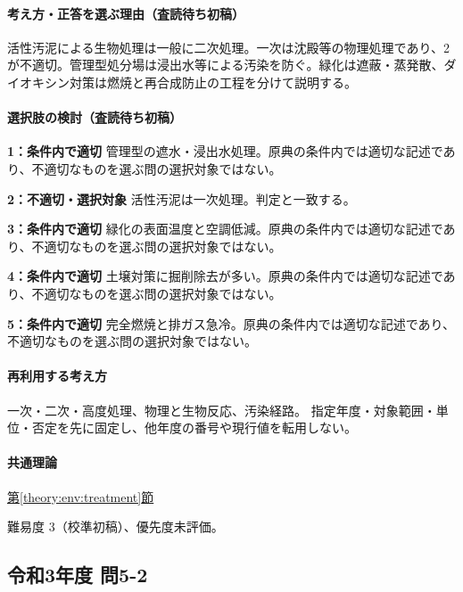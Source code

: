 \paragraph{考え方・正答を選ぶ理由（査読待ち初稿）} 活性汚泥による生物処理は一般に二次処理。一次は沈殿等の物理処理であり、2が不適切。管理型処分場は浸出水等による汚染を防ぐ。緑化は遮蔽・蒸発散、ダイオキシン対策は燃焼と再合成防止の工程を分けて説明する。

\paragraph{選択肢の検討（査読待ち初稿）}\mbox{}\par

\noindent\textbf{1：条件内で適切} 管理型の遮水・浸出水処理。原典の条件内では適切な記述であり、不適切なものを選ぶ問の選択対象ではない。\par

\noindent\textbf{2：不適切・選択対象} 活性汚泥は一次処理。判定と一致する。\par

\noindent\textbf{3：条件内で適切} 緑化の表面温度と空調低減。原典の条件内では適切な記述であり、不適切なものを選ぶ問の選択対象ではない。\par

\noindent\textbf{4：条件内で適切} 土壌対策に掘削除去が多い。原典の条件内では適切な記述であり、不適切なものを選ぶ問の選択対象ではない。\par

\noindent\textbf{5：条件内で適切} 完全燃焼と排ガス急冷。原典の条件内では適切な記述であり、不適切なものを選ぶ問の選択対象ではない。\par

\paragraph{再利用する考え方} 一次・二次・高度処理、物理と生物反応、汚染経路。 指定年度・対象範囲・単位・否定を先に固定し、他年度の番号や現行値を転用しない。

\paragraph{共通理論} \hyperref[theory:env:treatment]{第\ref*{theory:env:treatment}節}

\par 難易度 3（校準初稿）、優先度未評価。

\subsection{令和3年度 問5-2}
\label{q:r03-reg-basic-5-2}

